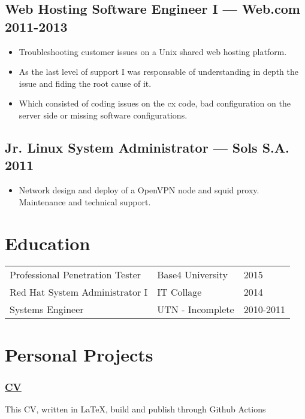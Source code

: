 \documentclass[11pt]{article}
\begin{document}
\subsection{Web Hosting Software Engineer I --- Web.com \hfill 2011-2013}
\begin{itemize}
  \setlength{\parskip}{0pt}
  \setlength{\itemsep}{0pt plus 1pt}
\item Troubleshooting customer issues on a Unix shared web hosting platform.
\item As the last level of support I was responsable of understanding in depth the issue and fiding the root cause of it.
\item Which consisted of coding issues on the cx code, bad configuration on the server side or missing software configurations.
\end{itemize}

\subsection{Jr. Linux System Administrator --- Sols S.A. \hfill 2011}
\begin{itemize}
  \setlength{\parskip}{0pt}
  \setlength{\itemsep}{0pt plus 1pt}
\item Network design and deploy of a OpenVPN node and squid proxy. Maintenance and technical support.
\end{itemize}


\section{Education}


\begin{tabular}{@{}lll@{}}
  \hspace{.1em} Professional Penetration Tester & Base4 University & 2015 \\
  \hspace{.1em} Red Hat System Administrator I  & IT Collage       & 2014 \\
  \hspace{.1em} Systems Engineer                & UTN - Incomplete & 2010-2011\\
\end{tabular}


\section{Personal Projects}

\subsubsection{\href {https://github.com/azimut/CV} {CV}}
This CV, written in LaTeX, build and publish through Github Actions
\end{document}
